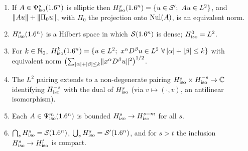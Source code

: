\begin{proposition}\label{isotropic:prop:Hiso}
\begin{enumerate}[label=\textup{(\roman*)}]
\item If $A\in\Psi^{s}_{\mathrm{iso}}(1.6^n)$ is elliptic then
  $\Hiso{s}(\R^n)=\{u\in\cSp;\ Au\in L^2\}$, and $\lVert Au\rVert+\lVert \Pi_0u\rVert$, with
  $\Pi_0$ the projection onto $\operatorname{Nul}(A)$, is an equivalent norm.
\item $H^{s}_{\mathrm{iso}}(1.6^n)$ is a Hilbert space in which $\mathcal{S}(1.6^n)$ is dense; $H^{0}_{\mathrm{iso}}=L^2$.
\item For $k\in\mathbb{N}_0$,
  $H^{k}_{\mathrm{iso}}(1.6^n)=\{u\in L^2;\ x^\alpha D^\beta u\in L^2\ \forall\,|\alpha|+|\beta|\le k\}$
  with equivalent norm $\bigl(\sum_{|\alpha|+|\beta|\le k}\lVert x^\alpha D^\beta u\rVert^2\bigr)^{1/2}$.
\item The $L^2$ pairing extends to a non-degenerate pairing
  $H^{s}_{\mathrm{iso}}\times H^{-s}_{\mathrm{iso}}\to\mathbb{C}$ identifying $H^{-s}_{\mathrm{iso}}$ with the dual of
  $H^{s}_{\mathrm{iso}}$ (via $v\mapsto(\cdot,v)$, an antilinear isomorphism).
\item Each $A\in\Psi^{m}_{\mathrm{iso}}(1.6^n)$ is bounded $H^{s}_{\mathrm{iso}}\to H^{s-m}_{\mathrm{iso}}$ for all $s$.
\item $\bigcap_sH^{s}_{\mathrm{iso}}=\mathcal{S}(1.6^n)$, $\bigcup_sH^{s}_{\mathrm{iso}}=\mathcal{S}'(1.6^n)$, and for $s>t$
  the inclusion $H^{s}_{\mathrm{iso}}\to H^{t}_{\mathrm{iso}}$ is compact.
\end{enumerate}
\end{proposition}
